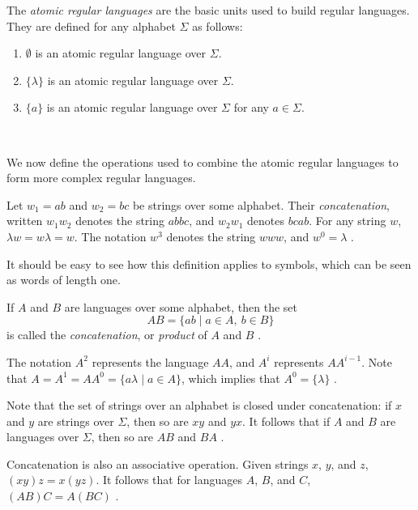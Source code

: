 \documentclass{bcthesis}
\renewcommand{\meo}[1]{}
\newcommand{\footcite}[2]{\xspace\cite[pg.~{#2}]{#1}\xspace}
\begin{document}
		\begin{definition}
			The \textit{atomic regular languages} are the basic units used to build regular languages.
			They are defined for any alphabet $\Sigma$ as follows:

			\begin{enumerate}[label=(\roman*), itemsep = -0.3 ex, nolistsep]
				\item $\emptyset$ is an atomic regular language over $\Sigma$.
				\item $\{ \lambda \}$ is an atomic regular language over $\Sigma$.
				\item $\{ a \}$ is an atomic regular language over $\Sigma$ for any $a \in \Sigma$.
			\end{enumerate}
			\footcite{hopcroft}{28}~ \meo{todo: something about this citation.}
		\end{definition}

		We now define the operations used to combine the atomic regular languages to form more complex regular languages.

		\begin{definition}[Concatenation]
			Let $w_1 = ab$ and $w_2 = bc$ be strings over some alphabet.
			Their \textit{concatenation}, written $w_1 w_2$ denotes the string $abbc$, and $w_2 w_1$ denotes $bcab$.
			For any string $w$, $\lambda w = w \lambda = w$.
			The notation $w^3$ denotes the string $www$, and $w^0 = \lambda$ \footcite{salomaa}{1}.

			It should be easy to see how this definition applies to symbols, which can be seen as words of length one.
		\end{definition}

		\begin{definition}
			If $A$ and $B$ are languages over some alphabet, then the set
			\[
				AB = \{ ab \mid a \in A, \ b \in B \}
			\]
			is called the \textit{concatenation}, or \textit{product} of $A$ and $B$ \footcite{lemmings}{3}.

			The notation $A^2$ represents the language $AA$, and $A^i$ represents $AA^{i-1}$.
			Note that $A = A^1 = AA^0 = \{ a \lambda \mid a \in A \}$, which implies that $A^0 = \{ \lambda \}$ \footcite{lemmings}{3}.
		\end{definition}

		\begin{remark}
			Note that the set of strings over an alphabet is closed under concatenation: if $x$ and $y$ are strings over $\Sigma$, then so are $xy$ and $yx$.
			It follows that if $A$ and $B$ are languages over $\Sigma$, then so are $AB$ and $BA$ \footcite{lemmings}{2}.
			
			Concatenation is also an associative operation.
			Given strings $x$, $y$, and $z$, $(xy)z = x(yz)$.
			It follows that for languages $A$, $B$, and $C$, ${(AB)C = A(BC)}$ \footcite{lemmings}{2}.

			\meo{
				Maybe also note that length has the properties of the logarithm with regard to concatenation.
				It's a curiosity, but not really useful information
			}

		\end{remark}
\end{document}
